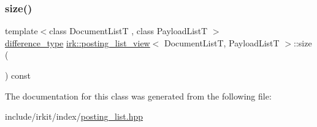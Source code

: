 \subsubsection{\texorpdfstring{size()}{size()}}
{\footnotesize\ttfamily template$<$class Document\+ListT , class Payload\+ListT $>$ \\
\mbox{\hyperlink{classirk_1_1posting__list__view_af57ab26b3de14b52ca2150cd90288567}{difference\+\_\+type}} \mbox{\hyperlink{classirk_1_1posting__list__view}{irk\+::posting\+\_\+list\+\_\+view}}$<$ Document\+ListT, Payload\+ListT $>$\+::size (\begin{DoxyParamCaption}{ }\end{DoxyParamCaption}) const\hspace{0.3cm}{\ttfamily [inline]}}



The documentation for this class was generated from the following file\+:\begin{DoxyCompactItemize}
\item 
include/irkit/index/\mbox{\hyperlink{posting__list_8hpp}{posting\+\_\+list.\+hpp}}\end{DoxyCompactItemize}
